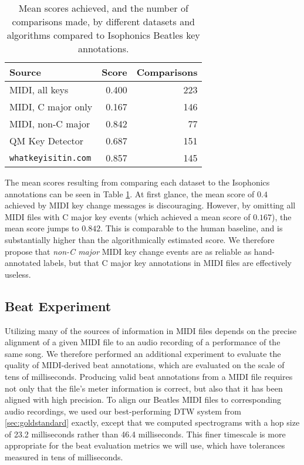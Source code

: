 \begin{table}
\begin{center}
\begin{tabular}{lrr}
  \toprule
  Source                     & Score & Comparisons \\
  \midrule
  MIDI, all keys             & 0.400 &         223 \\
  MIDI, C major only         & 0.167 &         146 \\
  MIDI, non-C major          & 0.842 &          77 \\
  QM Key Detector            & 0.687 &         151 \\
  \texttt{whatkeyisitin.com} & 0.857 &         145 \\
  \bottomrule
\end{tabular}
\end{center}
\caption[Evaluation scores of different key labellings compared to Isophonics]{Mean scores achieved, and the number of comparisons made, by different datasets and algorithms compared to Isophonics Beatles key annotations.}
  \label{tab:key}
\end{table}

The mean scores resulting from comparing each dataset to the Isophonics annotations can be seen in Table \ref{tab:key}.
At first glance, the mean score of $0.4$ achieved by MIDI key change messages is discouraging.
However, by omitting all MIDI files with C major key events (which achieved a mean score of $0.167$), the mean score jumps to $0.842$.
This is comparable to the human baseline, and is substantially higher than the algorithmically estimated score.
We therefore propose that \textit{non-C major} MIDI key change events are as reliable as hand-annotated labels, but that C major key annotations in MIDI files are effectively useless.

\subsection{Beat Experiment}

Utilizing many of the sources of information in MIDI files depends on the precise alignment of a given MIDI file to an audio recording of a performance of the same song.
We therefore performed an additional experiment to evaluate the quality of MIDI-derived beat annotations, which are evaluated on the scale of tens of milliseconds.
Producing valid beat annotations from a MIDI file requires not only that the file's meter information is correct, but also that it has been aligned with high precision.
To align our Beatles MIDI files to corresponding audio recordings, we used our best-performing DTW system from \cref{sec:goldstandard} exactly, except that we computed spectrograms with a hop size of 23.2 milliseconds rather than 46.4 milliseconds.
This finer timescale is more appropriate for the beat evaluation metrics we will use, which have tolerances measured in tens of milliseconds.

